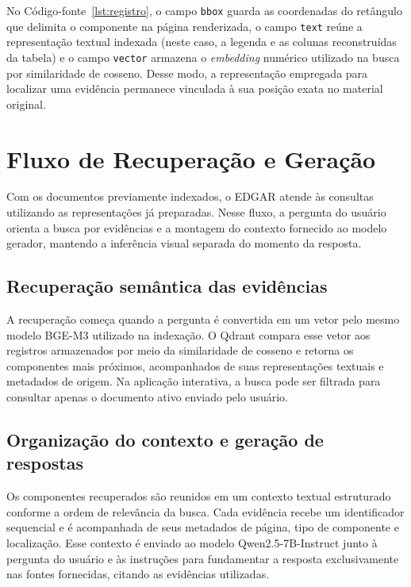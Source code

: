 No Código-fonte~\ref{lst:registro}, o campo \texttt{bbox} guarda as coordenadas do retângulo que delimita o componente na página renderizada, o campo \texttt{text} reúne a representação textual indexada (neste caso, a legenda e as colunas reconstruídas da tabela) e o campo \texttt{vector} armazena o \textit{embedding} numérico utilizado na busca por similaridade de cosseno. Desse modo, a representação empregada para localizar uma evidência permanece vinculada à sua posição exata no material original.

\section{Fluxo de Recuperação e Geração}
\label{sec:fluxo_sincrono_recuperacao_geracao}

Com os documentos previamente indexados, o EDGAR atende às consultas utilizando as representações já preparadas. Nesse fluxo, a pergunta do usuário orienta a busca por evidências e a montagem do contexto fornecido ao modelo gerador, mantendo a inferência visual separada do momento da resposta.

\subsection{Recuperação semântica das evidências}
\label{subsec:fase7_recuperacao_evidencias}

A recuperação começa quando a pergunta é convertida em um vetor pelo mesmo modelo BGE-M3 utilizado na indexação. O Qdrant compara esse vetor aos registros armazenados por meio da similaridade de cosseno e retorna os componentes mais próximos, acompanhados de suas representações textuais e metadados de origem. Na aplicação interativa, a busca pode ser filtrada para consultar apenas o documento ativo enviado pelo usuário.

\subsection{Organização do contexto e geração de respostas}
\label{subsec:fase8_engenharia_contexto}

Os componentes recuperados são reunidos em um contexto textual estruturado conforme a ordem de relevância da busca. Cada evidência recebe um identificador sequencial e é acompanhada de seus metadados de página, tipo de componente e localização. Esse contexto é enviado ao modelo Qwen2.5-7B-Instruct junto à pergunta do usuário e às instruções para fundamentar a resposta exclusivamente nas fontes fornecidas, citando as evidências utilizadas.


